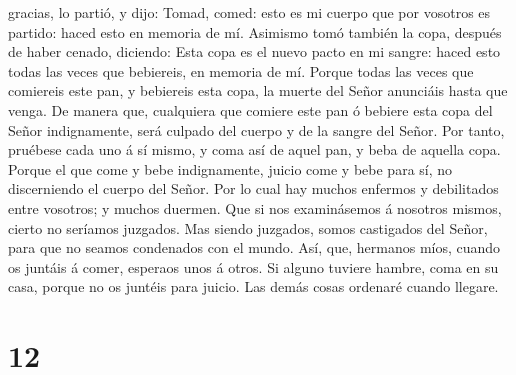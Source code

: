 gracias, lo partió, y dijo: Tomad, comed: esto es mi cuerpo que por
vosotros es partido: haced esto en memoria de mí. 
Asimismo tomó también la copa, después de haber cenado, diciendo: Esta
copa es el nuevo pacto en mi sangre: haced esto todas las veces que
bebiereis, en memoria de mí.  Porque todas las veces que
comiereis este pan, y bebiereis esta copa, la muerte del Señor anunciáis
hasta que venga.  De manera que, cualquiera que comiere
este pan ó bebiere esta copa del Señor indignamente, será culpado del
cuerpo y de la sangre del Señor.  Por tanto, pruébese
cada uno á sí mismo, y coma así de aquel pan, y beba de aquella copa.
 Porque el que come y bebe indignamente, juicio come y
bebe para sí, no discerniendo el cuerpo del Señor.  Por
lo cual hay muchos enfermos y debilitados entre vosotros; y muchos
duermen.  Que si nos examinásemos á nosotros mismos,
cierto no seríamos juzgados.  Mas siendo juzgados, somos
castigados del Señor, para que no seamos condenados con el mundo.
 Así, que, hermanos míos, cuando os juntáis á comer,
esperaos unos á otros.  Si alguno tuviere hambre, coma en
su casa, porque no os juntéis para juicio. Las demás cosas ordenaré
cuando llegare.

\hypertarget{section-11}{%
\section{12}\label{section-11}}

